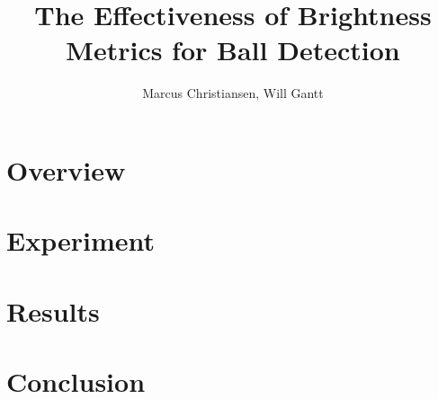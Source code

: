 \documentclass[11pt, twocolumn]{article}
\begin{document}
\title{The Effectiveness of Brightness Metrics for Ball Detection}
\author{Marcus Christiansen, Will Gantt}
\maketitle

\abstract{}
\section{Overview}
\section{Experiment}
\section{Results}
\section{Conclusion}
\end{document}
